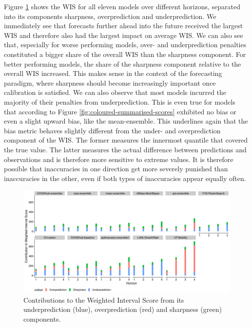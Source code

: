 \documentclass[
]{book}
\begin{document}
Figure \ref{fig:wis-contributions} shows the WIS for all eleven models over different horizons, separated into its components sharpness, overprediction and underprediction. We immediately see that forecasts further ahead into the future received the largest WIS and therefore also had the largest impact on average WIS. We can also see that, especially for worse performing models, over- and underprediction penalties constituted a bigger share of the overall WIS than the sharpness component. For better performing models, the share of the sharpness component relative to the overall WIS increased. This makes sense in the context of the forecasting paradigm, where sharpness should become increasingly important once calibration is satisfied. We can also observe that most models incurred the majority of their penalties from underprediction. This is even true for models that according to Figure \ref{fig:coloured-summarised-scores} exhibited no bias or even a slight upward bias, like the mean-ensemble. This underlines again that the bias metric behaves slightly different from the under- and overprediction component of the WIS. The former measures the innermost quantile that covered the true value. The latter measures the actual difference between predictions and observations and is therefore more sensitive to extreme values. It is therefore possible that inaccuracies in one direction get more severely punished than inaccuracies in the other, even if both types of inaccuracies appear equally often.

\begin{figure}

{\centering \includegraphics[width=1\linewidth]{../visualisation/chapter-5-results/scenario-baseline/wis-contributions} 

}

\caption{Contributions to the Weighted Interval Score from its underprediction (blue), overprediction (red) and sharpness (green) components.}\label{fig:wis-contributions}
\end{figure}
\end{document}
